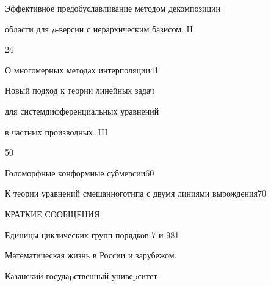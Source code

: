 

{Эффективное предобуславливание методом декомпозиции \newline


области для $p$-версии с иерархическим базисом. II}{24}




{О многомерных методах интерполяции}{41}




{Новый подход к теории линейных задач


для систем\newline дифференциальных уравнений


в частных производных. III}{50}




{Голоморфные конформные субмерсии}{60}




{К теории уравнений смешанного\newline типа с двумя линиями вырождения}{70}








\bigskip


{\centerline{КРАТКИЕ СООБЩЕНИЯ}}


\bigskip







{Единицы циклических групп порядков 7 и 9}{81}


\bigskip





\noindent Математическая жизнь в России и зарубежом.








\vfill


\noindent\raisebox{2pt}{\copyright} Казанский госудаpственный унивеpситет





